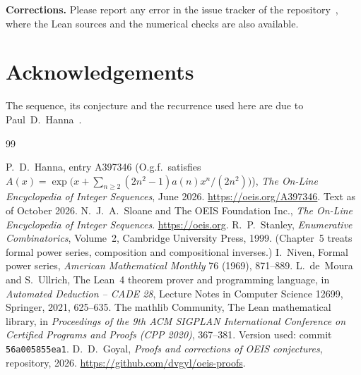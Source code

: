 \documentclass[11pt,a4paper]{article}
\theoremstyle{definition}
\theoremstyle{remark}
\newcommand{\para}[1]{\par\medskip\noindent\textbf{#1}\enspace}
\begin{document}
\para{Corrections.} Please report any error in the issue tracker of the repository~\cite{repo}, where the Lean sources and the numerical checks are also
available.

\section*{Acknowledgements}
The sequence, its conjecture and the recurrence used here are due to Paul~D.~Hanna~\cite{oeis}.

\begin{thebibliography}{99}\small
\raggedright
{} P.~D.~Hanna, entry A397346 (O.g.f.\ satisfies $A(x)=\exp\bigl(x+\sum_{n\ge2}(2n^2-1)a(n)x^n/(2n^2)\bigr)$), \emph{The On-Line Encyclopedia of Integer Sequences}, June 2026. \url{https://oeis.org/A397346}. Text as of October 2026.
 N.~J.~A.~Sloane and The OEIS Foundation Inc., \emph{The On-Line Encyclopedia of Integer Sequences}. \url{https://oeis.org}.
 R.~P.~Stanley, \emph{Enumerative Combinatorics}, Volume~2, Cambridge University Press, 1999. (Chapter~5 treats formal power series, composition and compositional inverses.)
 I.~Niven, Formal power series, \emph{American Mathematical Monthly} 76 (1969), 871--889.
 L.~de~Moura and S.~Ullrich, The Lean~4 theorem prover and programming language, in \emph{Automated Deduction -- CADE 28}, Lecture Notes in Computer Science 12699, Springer, 2021, 625--635.
 The mathlib Community, The Lean mathematical library, in \emph{Proceedings of the 9th ACM SIGPLAN International Conference on Certified Programs and Proofs (CPP 2020)}, 367--381. Version used: commit \texttt{56a005855ea1}.
 D.~D.~Goyal, \emph{Proofs and corrections of OEIS conjectures}, repository, 2026. \url{https://github.com/dvgyl/oeis-proofs}.
\end{thebibliography}
\end{document}
